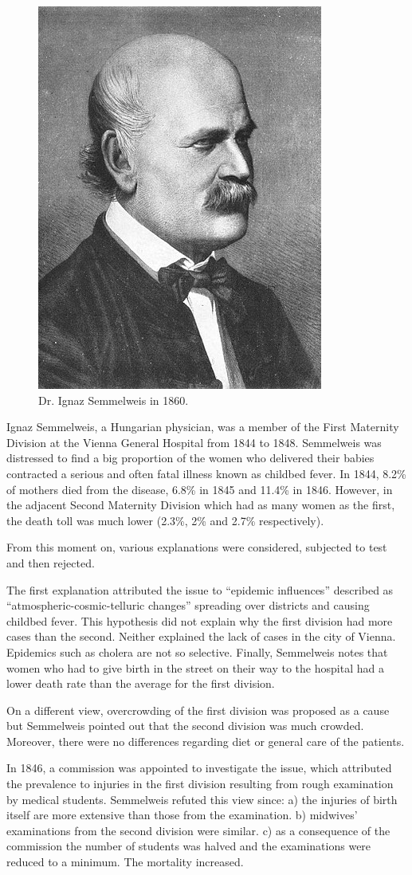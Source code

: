 \documentclass[
]{book}
\begin{document}
\begin{figure}  
 \begin{center}
    \includegraphics[width=.22\textwidth]{Figures/Semmelweis.jpg}  
  \captionsetup{labelformat=empty}
  \caption{Dr. Ignaz Semmelweis in 1860.} 
\end{center}
\end{figure}
\addtocounter{figure}{-1}

Ignaz Semmelweis, a Hungarian physician, was a member of the First Maternity Division at the Vienna General Hospital from 1844 to 1848. Semmelweis was distressed to find a big proportion of the women who delivered their babies contracted a serious and often fatal illness known as childbed fever. In 1844, 8.2\% of mothers died from the disease, 6.8\% in 1845 and 11.4\% in 1846. However, in the adjacent Second Maternity Division which had as many women as the first, the death toll was much lower (2.3\%, 2\% and 2.7\% respectively).

From this moment on, various explanations were considered, subjected to test and then rejected.

The first explanation attributed the issue to ``epidemic influences'' described as ``atmospheric-cosmic-telluric changes'' spreading over districts and causing childbed fever. This hypothesis did not explain why the first division had more cases than the second. Neither explained the lack of cases in the city of Vienna. Epidemics such as cholera are not so selective. Finally, Semmelweis notes that women who had to give birth in the street on their way to the hospital had a lower death rate than the average for the first division.

On a different view, overcrowding of the first division was proposed as a cause but Semmelweis pointed out that the second division was much crowded. Moreover, there were no differences regarding diet or general care of the patients.

In 1846, a commission was appointed to investigate the issue, which attributed the prevalence to injuries in the first division resulting from rough examination by medical students. Semmelweis refuted this view since: a) the injuries of birth itself are more extensive than those from the examination. b) midwives' examinations from the second division were similar. c) as a consequence of the commission the number of students was halved and the examinations were reduced to a minimum. The mortality increased.
\end{document}
